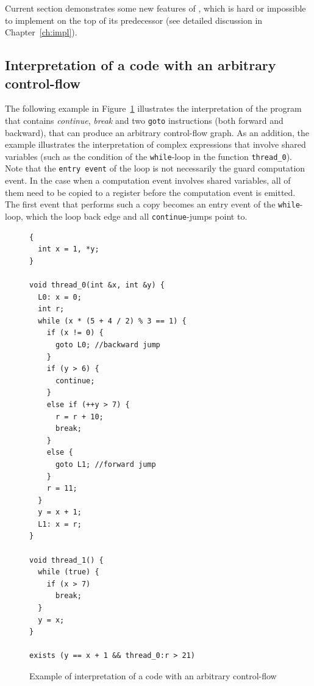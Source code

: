 Current section demonstrates some new features of \porthos[2], which is hard or impossible to implement on the top of its predecessor \porthos[1] (see detailed discussion in Chapter~\ref{ch:impl}).


\subsection{Interpretation of a code with an arbitrary control-flow}

The following example in Figure~\ref{ex:cfg-arbitrary} illustrates the interpretation of the program that contains \textit{continue}, \textit{break} and two \texttt{goto} instructions (both forward and backward), that can produce an arbitrary control-flow graph.
As an addition, the example illustrates the interpretation of complex expressions that involve shared variables (such as the condition of the \texttt{while}-loop in the function \texttt{thread\_0}).
Note that the \texttt{entry event} of the loop is not necessarily the guard computation event.
In the case when a computation event involves shared variables, all of them need to be copied to a register before the computation event is emitted.
The first event that performs such a copy becomes an entry event of the \texttt{while}-loop, which the loop back edge and all \texttt{continue}-jumps point to.


\begin{figure}[!h]
\begin{lstlisting}
{
  int x = 1, *y;
}

void thread_0(int &x, int &y) {
  L0: x = 0;
  int r;
  while (x * (5 + 4 / 2) % 3 == 1) {
    if (x != 0) {
      goto L0; //backward jump
    }
    if (y > 6) {
      continue;
    }
    else if (++y > 7) {
      r = r + 10;
      break;
    }
    else {
      goto L1; //forward jump
    }
    r = 11;
  }
  y = x + 1;
  L1: x = r;
}

void thread_1() {
  while (true) {
    if (x > 7)
      break;
  }
  y = x;
}

exists (y == x + 1 && thread_0:r > 21)

\end{lstlisting}
\caption{Example of interpretation of a code with an arbitrary control-flow}
\label{ex:cfg-arbitrary}
\end{figure}

